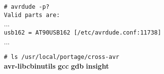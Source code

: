 \begin{center}
	\vspace{-\baselineskip}
	\begin{boxedminipage}[t]{\textwidth}
		\texttt{\# avrdude -p?} \\
		\texttt{Valid parts are:}\\
		...\\
		\texttt{usb162 = AT90USB162      [/etc/avrdude.conf:11738]}\\
		...
	\end{boxedminipage}
\end{center}


\begin{center}
	\vspace{-\baselineskip}
	\begin{boxedminipage}[t]{\textwidth}
	\texttt{\# ls /usr/local/portage/cross-avr}\\
	\textbf{avr-libc}\hspace{0.5cm}\textbf{binutils}
		\hspace{0.5cm}\textbf{gcc}
		\hspace{0.5cm}\textbf{gdb}
		\hspace{0.5cm}\textbf{insight}
	\end{boxedminipage}
\end{center}
